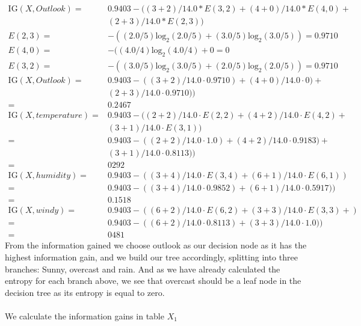 \documentclass{article}
\theoremstyle{remark}
\begin{document}
	\begin{align*}
	\text{IG}(X,Outlook)=&0.9403-((3+2)/14.0*E(3,2)+(4+0)/14.0*E(4,0)+
	\\&(2+3)/14.0*E(2,3))\\
	E(2,3)=& -( (2.0 / 5) \text{log}_2( 2.0/5)+ (3.0 / 5) \text{log}_2( 3.0/5))=0.9710 \\
	E(4,0)=& -( (4.0 / 4) \text{log}_2( 4.0/4)+0=0\\
	E(3,2)=& -( (3.0 / 5) \text{log}_2( 3.0/5)+ (2.0 / 5) \text{log}_2( 2.0/5))=0.9710\\
	\text{IG}(X,Outlook) =& 0.9403-((3+2)/14.0\cdot0.9710)+(4+0)/14.0\cdot0)+
	\\&(2+3)/14.0\cdot0.9710)) \\
	=&0.2467\\
	\text{IG}(X,temperature)=& 0.9403-((2+2)/14.0 \cdot E(2,2)+(4+2)/14.0 \cdot E(4,2)+\\
	&(3+1)/14.0 \cdot E(3,1))\\
	=&0.9403-((2+2)/14.0 \cdot 1.0)+(4+2)/14.0 \cdot 0.9183)+
	\\&(3+1)/14.0 \cdot 0.8113))
	\\=&0292
	\\\text{IG}(X,humidity)=& 0.9403-((3+4)/14.0 \cdot E(3,4)+(6+1)/14.0 \cdot E(6,1))
	\\=&0.9403-((3+4)/14.0 \cdot 0.9852)+(6+1)/14.0 \cdot 0.5917))
	\\=&0.1518
	\\\text{IG}(X,windy)=& 0.9403-((6+2)/14.0 \cdot E(6,2)+(3+3)/14.0 \cdot E(3,3)+) 
	\\=& 0.9403-((6+2)/14.0 \cdot 0.8113)+(3+3)/14.0 \cdot 1.0))\\
	=&0481
	\end{align*}             
	From the information gained we choose outlook as our decision node as it has the highest information gain, and we build our tree accordingly, splitting into three branches: Sunny, overcast and rain. And as we have already calculated the entropy for each branch above, we see that overcast should be a leaf node in the decision tree as its entropy is equal to zero. 
	\\\\We calculate the information gains in table $X_1$
\end{document}
